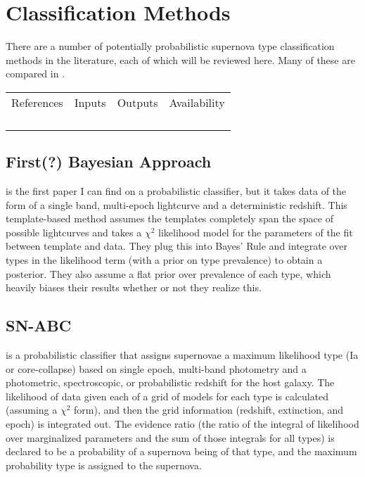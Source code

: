 \documentclass[12pt, onecolumn]{emulateapj}
\begin{document}
\section{Classification Methods}

There are a number of potentially probabilistic supernova type classification methods in the literature, each of which will be reviewed here.  Many of these are compared in \citet{Kessler10}.  

\begin{tabular}{cccc}
References&Inputs&Outputs&Availability\\
\citet{Kuznetsova06}&&&\\
\citet{Poznanski06}&&&\\
\citet{Rodney09, Rodney10}&&&\\
\citet{Sako11}&&&\\
\end{tabular}

\subsection{First(?) Bayesian Approach}

\citet{Kuznetsova06} is the first paper I can find on a probabilistic classifier, but it takes data of the form of a single band, multi-epoch lightcurve and a deterministic redshift.  This template-based method assumes the templates completely span the space of possible lightcurves and takes a $\chi^{2}$ likelihood model for the parameters of the fit between template and data.  They plug this into Bayes' Rule and integrate over types in the likelihood term (with a prior on type prevalence) to obtain a posterior.  They also assume a flat prior over prevalence of each type, which heavily biases their results whether or not they realize this.

\subsection{SN-ABC}

\citet{Poznanski06} is a probabilistic classifier that assigns supernovae a maximum likelihood type (Ia or core-collapse) based on single epoch, multi-band photometry and a photometric, spectroscopic, or probabilistic redshift for the host galaxy.  The likelihood of data given each of a grid of models for each type is calculated (assuming a $\chi^{2}$ form), and then the grid information (redshift, extinction, and epoch) is integrated out.  The evidence ratio (the ratio of the integral of likelihood over marginalized parameters and the sum of those integrals for all types) is declared to be a probability of a supernova being of that type, and the maximum probability type is assigned to the supernova.
\end{document}
